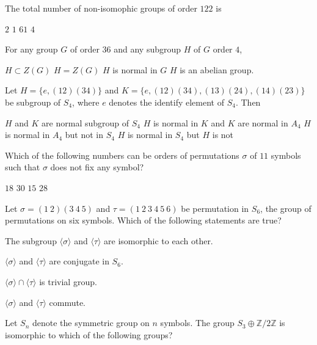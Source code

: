 \documentclass[10pt]{exam}
\begin{document}
\begin{questions}
\question 
The total number of non-isomophic groups of order $122$ is 

\begin{oneparchoices}
\choice $2$ 
\choice $1$ 
\choice $61$ 
\choice $4$
\end{oneparchoices} 

\question
For any group $G$ of order $36$ and any subgroup $H$ of $G$ order $4$,

\begin{checkboxes}
\choice $H \subset Z(G)$
\choice $H=Z(G)$
\choice $H$ is normal in $G$
\choice $H$ is an abelian group.
\end{checkboxes}

\question
Let $H=\{e,(12)(34)\}$ and $K=\{e,(12)(34),(13)(24),(14)(23)\}$ be subgroup of $S_4$, where $e$ denotes the identify element of $S_4$. Then

\begin{checkboxes}
\choice $H$ and $K$ are normal subgroup of $S_4$
\choice $H$ is normal in $K$ and $K$ are normal in $A_4$
\choice $H$ is normal in $A_4$ but not in $S_4$
\choice $H$ is normal in $S_4$ but $H$ is not
\end{checkboxes}

\question 
Which of the following numbers can be orders of permutations $\sigma$ of $11$ symbols such that $\sigma$ does not fix any symbol?

\begin{oneparcheckboxes}
\choice $18$
\choice $30$
\choice $15$
\choice $28$
\end{oneparcheckboxes}

\question 
Let $\sigma = (1~2)(3~4~5)$ and $\tau = (1~2~3~4~5~6)$ be permutation in $S_6$, the group of permutations on six symbols. Which of the following statements are true?

\begin{checkboxes}	
\item The subgroup $\langle \sigma \rangle$ and $\langle \tau \rangle$ are isomorphic to each other.
\item $\langle \sigma \rangle$ and $\langle \tau \rangle$ are conjugate in $S_6$.
\item $\langle \sigma \rangle \cap \langle \tau \rangle$ is trivial group. 
\item $\langle \sigma \rangle$ and $\langle \tau \rangle$ commute.
\end{checkboxes}

\question 
Let $S_n$ denote the symmetric group on $n$ symbols. The group $S_3 \oplus \mathbb{Z}/2\mathbb{Z}$ is isomorphic to which of the following groups?


\end{questions}
\end{document}
